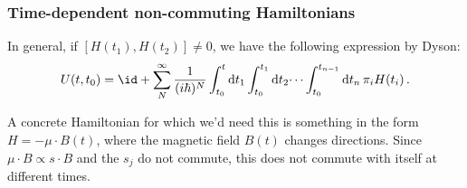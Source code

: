 \documentclass[main.tex]{subfiles}
\begin{document}
\subsubsection{Time-dependent non-commuting Hamiltonians}

In general, if \([H(t_1), H(t_2)] \neq 0\), we have the following expression by Dyson:
%
\begin{equation}
  U(t, t_0) = \id + \sum_N^{\infty}
  \frac{1}{(i \hbar)^N} \int_{t_0}^{t}\dd{t_1} \int_{t_0}^{t_1}\dd{t_2} \dots
  \int_{t_0}^{t_{n-1}} \dd{t_n} \pi_i H (t_i)\,.
\end{equation}

A concrete Hamiltonian for which we'd need this is something in the form \(H = - \mu \cdot B(t)\), where the magnetic field \(B(t)\) changes directions.
Since \(\mu \cdot B \propto s \cdot B\) and the \(s_j\) do not commute, this does not commute with itself at different times.  
\end{document}

